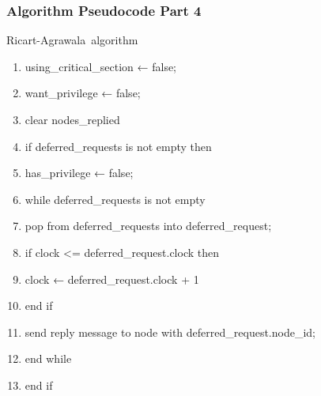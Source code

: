 \documentclass[11pt]{beamer}              %
\begin{document}
\begin{frame}
\frametitle{Algorithm Pseudocode Part 4}

\begin{center}
\begin{algorithm}[H]
	\scriptsize
	\def\algorithmlabel{Ricart-Agrawala}
    \caption{\algorithmlabel\ algorithm}
    \label{alg:ricart_agrawala}
    \begin{algorithmic}[1]
            \begin{enumerate}
                \item using\_critical\_section ← false;
                \item want\_privilege ← false;
                \item clear nodes\_replied
                \item if deferred\_requests is not empty then
                \item \quad has\_privilege ← false;
                \item \quad while deferred\_requests is not empty
                \item \quad \quad pop from deferred\_requests into deferred\_request;
                \item \quad \quad if clock <= deferred\_request.clock then
                \item \quad \quad \quad clock ← deferred\_request.clock + 1
                \item \quad \quad end if
                \item \quad \quad send reply message to node with deferred\_request.node\_id;
                \item \quad end while
                \item end if
            \end{enumerate}
    \end{algorithmic}
\end{algorithm}
\end{center}
\end{frame}
\end{document}
